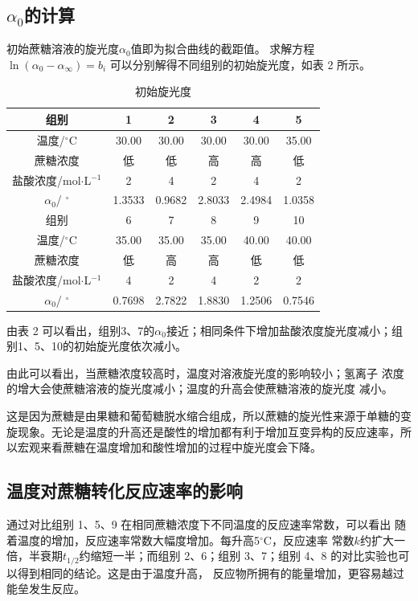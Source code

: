 \documentclass[12pt]{ctexart}
\numberwithin{equation}{section}
\begin{document}
\subsection{\texorpdfstring{$\alpha_0$的计算}{溶液初始旋光度的计算}}

初始蔗糖溶液的旋光度$\alpha_0$值即为拟合曲线的截距值。 求解方程 $\ln(\alpha_{0} - \alpha _{\infty})= b_i$ 可以分别解得不同组别的初始旋光度，如表 2 所示。

\begin{longtable}{|c|ccccc|}
    \caption{初始旋光度} \\
    \hline
    组别 & 1 & 2 & 3 & 4 & 5\\
    \hline
    温度/$^\circ$C & 30.00 & 30.00 & 30.00 & 30.00 & 35.00  \\
    蔗糖浓度 & 低 & 低 & 高 & 高 & 低 \\
    盐酸浓度/mol$\cdot$L$^{-1}$ & 2 & 4 & 2 & 4 & 2\\
    $\alpha_0 $/ $^\circ$ & 1.3533 & 0.9682 & 2.8033 & 2.4984 & 1.0358 \\
    \hline
    组别 & 6 & 7 & 8 & 9 & 10\\
    \hline
    温度/$^\circ$C  & 35.00 & 35.00 & 35.00 & 40.00 & 40.00 \\
    蔗糖浓度 & 低 & 高 & 高 & 低 & 低 \\
    盐酸浓度/mol$\cdot$L$^{-1}$ & 4 & 2 & 4 & 2 & 2 \\
    $\alpha_0 $/ $^\circ$ & 0.7698 & 2.7822 & 1.8830 & 1.2506 & 0.7546 \\
    \hline
\end{longtable}



由表 2 可以看出，组别3、7的$\alpha_0$接近；相同条件下增加盐酸浓度旋光度减小；组别1、5、10的初始旋光度依次减小。

由此可以看出，当蔗糖浓度较高时，温度对溶液旋光度的影响较小；氢离子
浓度的增大会使蔗糖溶液的旋光度减小；温度的升高会使蔗糖溶液的旋光度
减小。

这是因为蔗糖是由果糖和葡萄糖脱水缩合组成，所以蔗糖的旋光性来源于单糖的变旋现象。无论是温度的升高还是酸性的增加都有利于增加互变异构的反应速率，所以宏观来看蔗糖在温度增加和酸性增加的过程中旋光度会下降。

\subsection{温度对蔗糖转化反应速率的影响}

通过对比组别 1、5、9 在相同蔗糖浓度下不同温度的反应速率常数，可以看出
随着温度的增加，反应速率常数大幅度增加。每升高5$^\circ$C，反应速率
常数$k$约扩大一倍，半衰期$t_{1/2}$约缩短一半；而组别 2、6；组别
3、7；组别 4、8 的对比实验也可以得到相同的结论。这是由于温度升高，
反应物所拥有的能量增加，更容易越过能垒发生反应。
\end{document}
